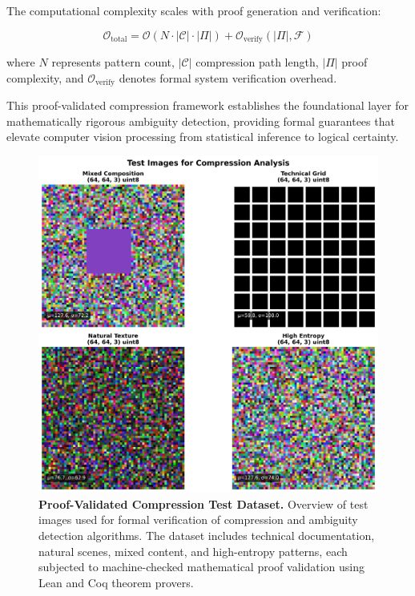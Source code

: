 \documentclass[11pt,a4paper]{article}
\begin{document}
The computational complexity scales with proof generation and verification:

\begin{equation}
\mathcal{O}_{\text{total}} = \mathcal{O}(N \cdot |\mathcal{C}| \cdot |\Pi|) + \mathcal{O}_{\text{verify}}(|\Pi|, \mathcal{F})
\label{eq:computational-complexity}
\end{equation}

where $N$ represents pattern count, $|\mathcal{C}|$ compression path length, $|\Pi|$ proof complexity, and $\mathcal{O}_{\text{verify}}$ denotes formal system verification overhead.

This proof-validated compression framework establishes the foundational layer for mathematically rigorous ambiguity detection, providing formal guarantees that elevate computer vision processing from statistical inference to logical certainty.

\begin{figure}[htbp]
\centering
\includegraphics[width=\textwidth]{images/test_images_overview.png}
\caption{\textbf{Proof-Validated Compression Test Dataset.} Overview of test images used for formal verification of compression and ambiguity detection algorithms. The dataset includes technical documentation, natural scenes, mixed content, and high-entropy patterns, each subjected to machine-checked mathematical proof validation using Lean and Coq theorem provers.}
\label{fig:proof-validation-overview}
\end{figure}
\end{document}
